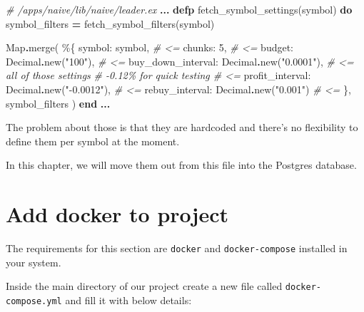 \documentclass[
]{book}
\newenvironment{Shaded}{\begin{snugshade}}{\end{snugshade}}
\newcommand{\CommentTok}[1]{\textcolor[rgb]{0.56,0.35,0.01}{\textit{#1}}}
\newcommand{\ConstantTok}[1]{\textcolor[rgb]{0.00,0.00,0.00}{#1}}
\newcommand{\DecValTok}[1]{\textcolor[rgb]{0.00,0.00,0.81}{#1}}
\newcommand{\KeywordTok}[1]{\textcolor[rgb]{0.13,0.29,0.53}{\textbf{#1}}}
\newcommand{\NormalTok}[1]{#1}
\newcommand{\OperatorTok}[1]{\textcolor[rgb]{0.81,0.36,0.00}{\textbf{#1}}}
\newcommand{\StringTok}[1]{\textcolor[rgb]{0.31,0.60,0.02}{#1}}
\newcommand{\VariableTok}[1]{\textcolor[rgb]{0.00,0.00,0.00}{#1}}
\begin{document}
\begin{Shaded}
\begin{Highlighting}[]
  \CommentTok{\# /apps/naive/lib/naive/leader.ex}
  \OperatorTok{...}
  \KeywordTok{defp}\NormalTok{ fetch\_symbol\_settings(symbol) }\KeywordTok{do}
\NormalTok{    symbol\_filters }\OperatorTok{=}\NormalTok{ fetch\_symbol\_filters(symbol)}

    \ConstantTok{Map}\OperatorTok{.}\NormalTok{merge(}
\NormalTok{      \%\{}
        \VariableTok{symbol:}\NormalTok{ symbol,                           }\CommentTok{\# \textless{}=}
        \VariableTok{chunks:} \DecValTok{5}\NormalTok{,                                }\CommentTok{\# \textless{}=}
        \VariableTok{budget:} \ConstantTok{Decimal}\OperatorTok{.}\NormalTok{new(}\StringTok{"100"}\NormalTok{),               }\CommentTok{\# \textless{}=}
        \VariableTok{buy\_down\_interval:} \ConstantTok{Decimal}\OperatorTok{.}\NormalTok{new(}\StringTok{"0.0001"}\NormalTok{), }\CommentTok{\# \textless{}= all of those settings}
        \CommentTok{\# {-}0.12\% for quick testing                \# \textless{}=}
        \VariableTok{profit\_interval:} \ConstantTok{Decimal}\OperatorTok{.}\NormalTok{new(}\StringTok{"{-}0.0012"}\NormalTok{),  }\CommentTok{\# \textless{}=}
        \VariableTok{rebuy\_interval:} \ConstantTok{Decimal}\OperatorTok{.}\NormalTok{new(}\StringTok{"0.001"}\NormalTok{)      }\CommentTok{\# \textless{}=}
\NormalTok{      \},}
\NormalTok{      symbol\_filters}
\NormalTok{    )}
  \KeywordTok{end}
  \OperatorTok{...}
\end{Highlighting}
\end{Shaded}

The problem about those is that they are hardcoded and there's no flexibility to define them per symbol at the moment.

In this chapter, we will move them out from this file into the Postgres database.

\hypertarget{add-docker-to-project}{%
\section{Add docker to project}\label{add-docker-to-project}}

The requirements for this section are \texttt{docker} and \texttt{docker-compose} installed in your system.

Inside the main directory of our project create a new file called \texttt{docker-compose.yml} and fill it with below details:
\end{document}
